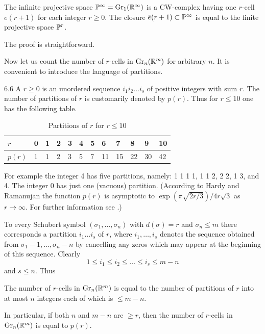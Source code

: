 \documentclass[../main]{subfiles}
\begin{document}
\begin{corollary}
\label{cor:06.05}
The infinite projective space $\mathbb{P}^{\infty}=\operatorname{Gr}_{1}(\mathbb R^\infty)$ is a CW-complex having one $r$-cell $e(r+1)$ for each integer $r \geq 0$. The closure $\xoverline{e}(r+1) \subset \projective^{\infty}$ is equal to the finite projective space $\mathbb{P}^{r}$.
\end{corollary}
The proof is straightforward.

Now let us count the number of $r$-cells in $\operatorname{Gr}_{n}(\mathbb R^m)$ for arbitrary $n$. It is convenient to introduce the language of partitions. 
\pagebreak
\begin{customdef}{6.6}
\label{def:06.06}
A  $r \geq 0$ is an unordered sequence $i_{1} i_{2} \dots i_{s}$ of positive integers with sum $r$. The number of partitions of $r$ is customarily denoted by $p(r) $. Thus for $r \leq 10$ one has the following table.

\begin{table}[!h]
\centering
\begin{tabular}{|l|lllllllllll|}
	\hline
	$r$ & 0 & 1 & 2 & 3 & 4 & 5 & 6 & 7 & 8 & 9 & 10 \\
	\hline
	$p(r)$ & 1 & 1 & 2 & 3 & 5 & 7 & 11 & 15 & 22 & 30 & 42 \\
	\hline
\end{tabular}
\caption{Partitions of $r$ for $r\leq 10$}
\end{table}
\end{customdef}
For example the integer 4 has five partitions, namely: 1 1 1 1, 1 1 2, 2 2, 1 3, and 4. The integer 0 has just one (vacuous) partition. (According to Hardy and Ramanujan the function $p(r)$ is asymptotic to $\exp (\pi \sqrt{2 r / 3}) / 4 r \sqrt{3}$ as $r\rightarrow \infty$. For further information see \cite{ostmann1956}.)

To every Schubert symbol $(\sigma_{1},\dots, \sigma_{n})$ with $d(\sigma)=r$ and $\sigma_{n} \leq m$ there corresponds a partition $i_{1}\dots i_{s}$ of $r$, where $i_{1},\dots, i_{s}$ denotes the sequence obtained from $\sigma_{1}-1,\dots, \sigma_{n}-n$ by cancelling any zeros which may appear at the beginning of this sequence. Clearly
\[
1 \leq i_{1} \leq i_{2} \leq\dots \leq i_{s} \leq m-n
\]
and $s \leq n $. Thus
\setcounter{theorem}{6}
\begin{corollary}
\label{cor:06.07}
The number of $r$-cells in $\operatorname{Gr}_{n}(\mathbb R^m)$ is equal to the number of partitions of $r$ into at most $n$ integers each of which is $\leq m-n$.
\end{corollary}
In particular, if both $n$ and $m-n$ are $\geq r$, then the number of $r$-cells in $\operatorname{Gr}_{n}(\mathbb R^m)$ is equal to $p(r)$.
\end{document}
